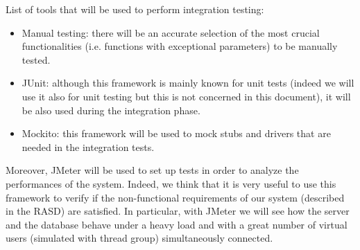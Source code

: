 List of tools that will be used to perform integration testing:
\begin{itemize}
    \item Manual testing: there will be an accurate selection of the most crucial functionalities (i.e. functions with exceptional parameters) to be manually tested.
    \item JUnit: although this framework is mainly known for unit tests (indeed we will use it also for unit testing but this is not concerned in this document), it will be also used during the integration phase.
    \item Mockito: this framework will be used to mock stubs and drivers that are needed in the integration tests.
\end{itemize}
Moreover, JMeter will be used to set up tests in order to analyze the performances of the system. Indeed, we think that it is very useful to use this framework to verify if the non-functional requirements of our system (described in the RASD) are satisfied.
\newline
In particular, with JMeter we will see how the server and the database behave under a heavy load and with a great number of virtual users (simulated with thread group) simultaneously connected.